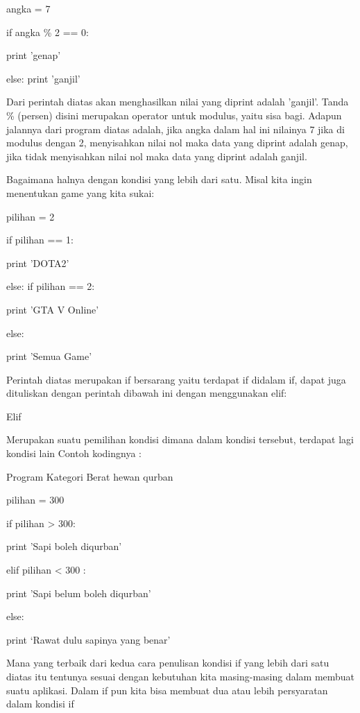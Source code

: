 angka = 7 
 

if angka    \%   2 == 0: 
 

        print 'genap' 
 

else:
   print 'ganjil' 
 

 Dari perintah diatas akan menghasilkan nilai yang diprint adalah 'ganjil'. Tanda    \%   (persen) disini merupakan operator untuk modulus, yaitu sisa bagi. Adapun jalannya dari program diatas adalah, jika angka dalam hal ini nilainya 7 jika di modulus dengan 2, menyisahkan nilai nol maka data yang diprint adalah genap, jika tidak menyisahkan nilai nol maka data yang diprint adalah ganjil. 
 

Bagaimana halnya dengan kondisi yang lebih dari satu. Misal kita ingin menentukan game yang kita sukai: 
 

pilihan = 2 
 

if pilihan == 1: 
 

        print 'DOTA2' 
 

else:
        if pilihan == 2: 
 

                print 'GTA V Online' 
 

        else: 
 

                print 'Semua Game' 
 

Perintah diatas merupakan if bersarang yaitu terdapat if didalam if, dapat juga dituliskan dengan perintah dibawah ini dengan menggunakan elif: 
 


Elif 
 

Merupakan suatu pemilihan kondisi dimana dalam kondisi tersebut, terdapat lagi kondisi lain
Contoh kodingnya : 
 

Program Kategori Berat hewan qurban 
 

pilihan = 300 
 

if pilihan > 300: 
 

        print 'Sapi boleh diqurban' 
 

elif pilihan <    300 : 
 

        print 'Sapi belum boleh diqurban' 
 

else: 
 

        print ‘Rawat dulu sapinya yang benar' 
 

Mana yang terbaik dari kedua cara penulisan kondisi if yang lebih dari satu diatas itu tentunya sesuai dengan kebutuhan kita masing-masing dalam membuat suatu aplikasi. Dalam if pun kita bisa membuat dua atau lebih persyaratan dalam kondisi if 
 


